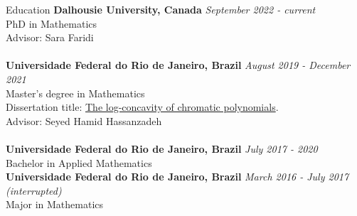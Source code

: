 \documentclass[12pt]{resume} %
\begin{document}

\begin{rSection}{Education}
{\bf Dalhousie University, Canada} \hfill {\em September 2022 - current} 
\\ PhD in Mathematics
\\ Advisor: Sara Faridi
\\
\\{\bf Universidade Federal do Rio de Janeiro, Brazil} \hfill {\em August 2019 - December 2021} 
\\ Master's degree in Mathematics
\\ Dissertation title: \href{https://hollebenthiago.github.io/msc/main.pdf}{The log-concavity of chromatic polynomials}.
\\ Advisor: Seyed Hamid Hassanzadeh
\\
\\
{\bf Universidade Federal do Rio de Janeiro, Brazil} \hfill {\em July 2017 - 2020} 
\\ Bachelor in Applied Mathematics
\\
{\bf Universidade Federal do Rio de Janeiro, Brazil} \hfill {\em March 2016 - July 2017 (interrupted)} 
\\ Major in Mathematics
\\
\end{rSection}



\end{document}
